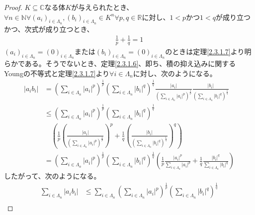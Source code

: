 \documentclass[dvipdfmx]{jsarticle}
\begin{document}
\begin{proof}
$K \subseteq \mathbb{C}$なる体$K$が与えられたとき、$\forall n \in \mathbb{N}\forall\left( a_{i} \right)_{i \in \varLambda_{n}},\left( b_{i} \right)_{i \in \varLambda_{n}} \in K^{n}\forall p,q \in \mathbb{R}$に対し、$1 < p$かつ$1 < q$が成り立つかつ、次式が成り立つとき、
\begin{align*}
\frac{1}{p} + \frac{1}{q} = 1
\end{align*}
$\left( a_{i} \right)_{i \in \varLambda_{n}} = (0)_{i \in \varLambda_{n}}$または$\left( b_{i} \right)_{i \in \varLambda_{n}} = (0)_{i \in \varLambda_{n}}$のときは定理\ref{2.3.1.7}より明らかである。そうでないとき、定理\ref{2.3.1.6}、即ち、積の抑え込みに関するYoungの不等式と定理\ref{2.3.1.7}より$\forall i \in \varLambda_{n}$に対し、次のようになる。
\begin{align*}
\left| a_{i}b_{i} \right| &= \left( \sum_{i \in \varLambda_{n}} \left| a_{i} \right|^{p} \right)^{\frac{1}{p}}\left( \sum_{i \in \varLambda_{n}} \left| b_{i} \right|^{q} \right)^{\frac{1}{q}}\frac{\left| a_{i} \right|}{\left( \sum_{i \in \varLambda_{n}} \left| a_{i} \right|^{p} \right)^{\frac{1}{p}}}\frac{\left| b_{i} \right|}{\left( \sum_{i \in \varLambda_{n}} \left| b_{i} \right|^{q} \right)^{\frac{1}{q}}}\\
&\leq \left( \sum_{i \in \varLambda_{n}} \left| a_{i} \right|^{p} \right)^{\frac{1}{p}}\left( \sum_{i \in \varLambda_{n}} \left| b_{i} \right|^{q} \right)^{\frac{1}{q}}\\ 
&\quad \left( \frac{1}{p}\left( \frac{\left| a_{i} \right|}{\left( \sum_{i \in \varLambda_{n}} \left| a_{i} \right|^{p} \right)^{\frac{1}{p}}} \right)^{p} + \frac{1}{q}\left( \frac{\left| b_{i} \right|}{\left( \sum_{i \in \varLambda_{n}} \left| b_{i} \right|^{q} \right)^{\frac{1}{q}}} \right)^{q} \right)\\
&= \left( \sum_{i \in \varLambda_{n}} \left| a_{i} \right|^{p} \right)^{\frac{1}{p}}\left( \sum_{i \in \varLambda_{n}} \left| b_{i} \right|^{q} \right)^{\frac{1}{q}}\left( \frac{1}{p}\frac{\left| a_{i} \right|^{p}}{\sum_{i \in \varLambda_{n}} \left| a_{i} \right|^{p}} + \frac{1}{q}\frac{\left| b_{i} \right|^{q}}{\sum_{i \in \varLambda_{n}} \left| b_{i} \right|^{q}} \right)
\end{align*}
したがって、次のようになる。
\begin{align*}
\sum_{i \in \varLambda_{n}} \left| a_{i}b_{i} \right| &\leq \sum_{i \in \varLambda_{n}} \left( \sum_{i \in \varLambda_{n}} \left| a_{i} \right|^{p} \right)^{\frac{1}{p}}\left( \sum_{i \in \varLambda_{n}} \left| b_{i} \right|^{q} \right)^{\frac{1}{q}}\\

\end{align*}
\end{proof}
\end{document}
